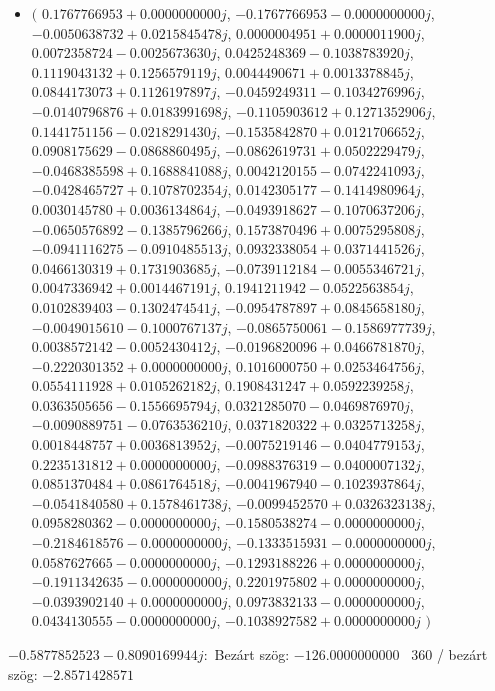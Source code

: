\documentclass[14pt,a4paper]{article}
\begin{document}
\begin{itemize}
\item
$\big($
$0.1767766953+0.0000000000j$, $-0.1767766953-0.0000000000j$, $-0.0050638732+0.0215845478j$, $0.0000004951+0.0000011900j$, $0.0072358724-0.0025673630j$, $0.0425248369-0.1038783920j$, $0.1119043132+0.1256579119j$, $0.0044490671+0.0013378845j$, $0.0844173073+0.1126197897j$, $-0.0459249311-0.1034276996j$, $-0.0140796876+0.0183991698j$, $-0.1105903612+0.1271352906j$, $0.1441751156-0.0218291430j$, $-0.1535842870+0.0121706652j$, $0.0908175629-0.0868860495j$, $-0.0862619731+0.0502229479j$, $-0.0468385598+0.1688841088j$, $0.0042120155-0.0742241093j$, $-0.0428465727+0.1078702354j$, $0.0142305177-0.1414980964j$, $0.0030145780+0.0036134864j$, $-0.0493918627-0.1070637206j$, $-0.0650576892-0.1385796266j$, $0.1573870496+0.0075295808j$, $-0.0941116275-0.0910485513j$, $0.0932338054+0.0371441526j$, $0.0466130319+0.1731903685j$, $-0.0739112184-0.0055346721j$, $0.0047336942+0.0014467191j$, $0.1941211942-0.0522563854j$, $0.0102839403-0.1302474541j$, $-0.0954787897+0.0845658180j$, $-0.0049015610-0.1000767137j$, $-0.0865750061-0.1586977739j$, $0.0038572142-0.0052430412j$, $-0.0196820096+0.0466781870j$, $-0.2220301352+0.0000000000j$, $0.1016000750+0.0253464756j$, $0.0554111928+0.0105262182j$, $0.1908431247+0.0592239258j$, $0.0363505656-0.1556695794j$, $0.0321285070-0.0469876970j$, $-0.0090889751-0.0763536210j$, $0.0371820322+0.0325713258j$, $0.0018448757+0.0036813952j$, $-0.0075219146-0.0404779153j$, $0.2235131812+0.0000000000j$, $-0.0988376319-0.0400007132j$, $0.0851370484+0.0861764518j$, $-0.0041967940-0.1023937864j$, $-0.0541840580+0.1578461738j$, $-0.0099452570+0.0326323138j$, $0.0958280362-0.0000000000j$, $-0.1580538274-0.0000000000j$, $-0.2184618576-0.0000000000j$, $-0.1333515931-0.0000000000j$, $0.0587627665-0.0000000000j$, $-0.1293188226+0.0000000000j$, $-0.1911342635-0.0000000000j$, $0.2201975802+0.0000000000j$, $-0.0393902140+0.0000000000j$, $0.0973832133-0.0000000000j$, $0.0434130555-0.0000000000j$, $-0.1038927582+0.0000000000j$
$\big)$
\end{itemize}
$-0.5877852523-0.8090169944j$:\
Bezárt szög: $-126.0000000000$ \
360 / bezárt szög: $-2.8571428571$\
\end{document}
